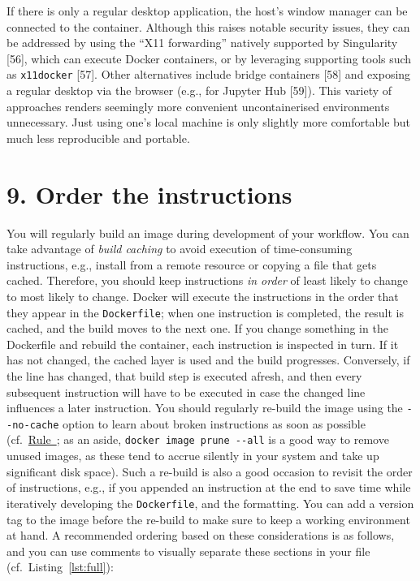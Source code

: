 \documentclass[10pt,letterpaper]{article}
\begin{document}
\normalsize

If there is only a regular desktop application, the host's window
manager can be connected to the container. Although this raises notable
security issues, they can be addressed by using the ``X11 forwarding''
natively supported by Singularity {[}56{]}, which can execute Docker
containers, or by leveraging supporting tools such as \texttt{x11docker}
{[}57{]}. Other alternatives include bridge containers {[}58{]} and
exposing a regular desktop via the browser (e.g., for Jupyter Hub
{[}59{]}). This variety of approaches renders seemingly more convenient
uncontainerised environments unnecessary. Just using one's local machine
is only slightly more comfortable but much less reproducible and
portable.

\hypertarget{order-the-instructions}{%
\section{9. Order the instructions}\label{order-the-instructions}}

  \label{rule:order} 

You will regularly build an image during development of your workflow.
You can take advantage of \emph{build caching} to avoid execution of
time-consuming instructions, e.g., install from a remote resource or
copying a file that gets cached. Therefore, you should keep instructions
\emph{in order} of least likely to change to most likely to change.
Docker will execute the instructions in the order that they appear in
the \texttt{Dockerfile}; when one instruction is completed, the result
is cached, and the build moves to the next one. If you change something
in the Dockerfile and rebuild the container, each instruction is
inspected in turn. If it has not changed, the cached layer is used and
the build progresses. Conversely, if the line has changed, that build
step is executed afresh, and then every subsequent instruction will have
to be executed in case the changed line influences a later instruction.
You should regularly re-build the image using the \texttt{-\/-no-cache}
option to learn about broken instructions as soon as possible
(cf.~\hyperref[{rule:usage}]{Rule~}; as an aside,
\texttt{docker\ image\ prune\ -\/-all} is a good way to remove unused
images, as these tend to accrue silently in your system and take up
significant disk space). Such a re-build is also a good occasion to
revisit the order of instructions, e.g., if you appended an instruction
at the end to save time while iteratively developing the
\texttt{Dockerfile}, and the formatting. You can add a version tag to
the image before the re-build to make sure to keep a working environment
at hand. A recommended ordering based on these considerations is as
follows, and you can use comments to visually separate these sections in
your file (cf.~Listing~\ref{lst:full}):
\end{document}
